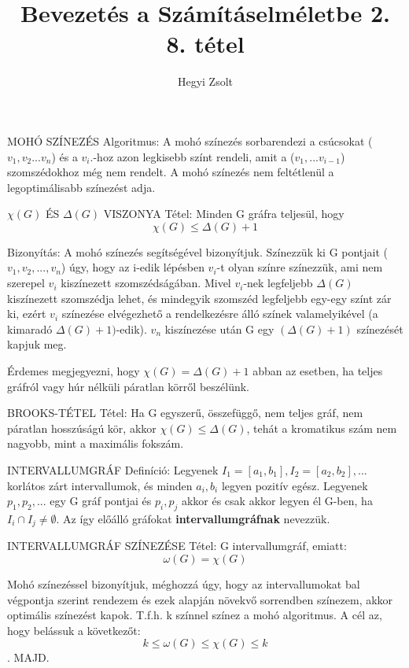 \documentclass[]{article}
\title{Bevezetés a Számításelméletbe 2.\\{\large 8. tétel}}
\author{Hegyi Zsolt}
\begin{document}
\maketitle
\begin{framed}
MOHÓ SZÍNEZÉS Algoritmus: A mohó színezés sorbarendezi a csúcsokat ($v_1, v_2...v_n$) és a $v_i.$-hoz azon legkisebb színt rendeli, amit a ($v_1,...v_{i-1}$) szomszédokhoz még nem rendelt. A mohó színezés nem feltétlenül a legoptimálisabb színezést adja.
\end{framed}
\begin{framed}
$\chi(G)$ ÉS $\Delta(G)$ VISZONYA Tétel: Minden	G gráfra teljesül, hogy
$$\chi(G) \leq \Delta(G)+1$$
\end{framed}
\begin{leftbar}
Bizonyítás: A mohó színezés segítségével bizonyítjuk. Színezzük ki G pontjait ($v_1, v_2,..., v_n$) úgy, hogy az i-edik lépésben $v_i$-t olyan színre színezzük, ami nem szerepel $v_i$ kiszínezett szomszédságában. Mivel $v_i$-nek legfeljebb $\Delta(G)$ kiszínezett szomszédja lehet, és mindegyik szomszéd legfeljebb egy-egy színt zár ki, ezért $v_i$ színezése elvégezhető a rendelkezésre álló színek valamelyikével (a kimaradó $\Delta(G)+1)$-edik). $v_n$ kiszínezése után G egy $(\Delta(G)+1)$ színezését kapjuk meg.
\end{leftbar}
Érdemes megjegyezni, hogy $\chi(G) = \Delta(G)+1$ abban az esetben, ha teljes gráfról vagy húr nélküli páratlan körről beszélünk.
\begin{framed}
BROOKS-TÉTEL Tétel: Ha G egyszerű, összefüggő, nem teljes gráf, nem páratlan hosszúságú kör, akkor $\chi(G) \leq \Delta(G)$, tehát a kromatikus szám nem nagyobb, mint a maximális fokszám.
\end{framed}
\begin{shaded}
INTERVALLUMGRÁF Definíció: Legyenek $I_1 = [a_1, b_1], I_2 = [a_2, b_2],...$ korlátos zárt intervallumok, és minden $a_i, b_i$ legyen pozitív egész. Legyenek $p_1, p_2,...$ egy G gráf pontjai és ${p_i, p_j}$ akkor és csak akkor legyen él G-ben, ha $I_i\cap I_j \not= \emptyset$. Az így előálló gráfokat \textbf{intervallumgráfnak} nevezzük.
\end{shaded}
\begin{framed}
INTERVALLUMGRÁF SZÍNEZÉSE Tétel: G intervallumgráf, emiatt:
$$\omega(G) = \chi(G)$$
\end{framed}
\begin{leftbar}
Mohó színezéssel bizonyítjuk, méghozzá úgy, hogy az intervallumokat bal végpontja szerint rendezem és ezek alapján növekvő sorrendben színezem, akkor optimális színezést kapok. T.f.h. k színnel színez a mohó algoritmus. A cél az, hogy belássuk a következőt:
$$k \leq \omega(G) \leq \chi(G) \leq k$$. MAJD.
\end{leftbar}
\end{document}

